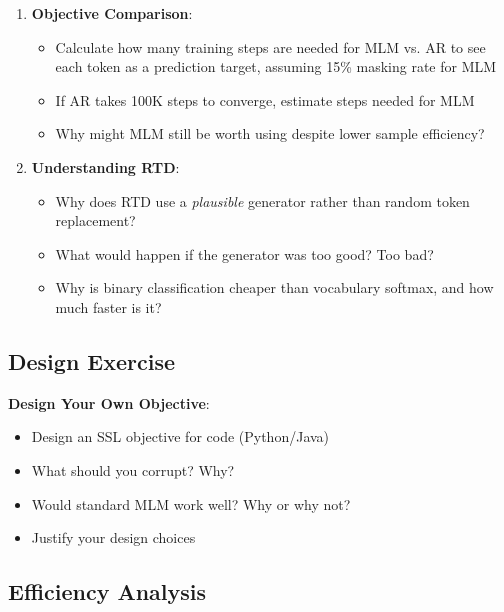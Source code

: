\documentclass{article}
\begin{document}
\begin{enumerate}
\item \textbf{Objective Comparison}:
\begin{itemize}
\item Calculate how many training steps are needed for MLM vs. AR to see each token as a prediction target, assuming 15\% masking rate for MLM
\item If AR takes 100K steps to converge, estimate steps needed for MLM
\item Why might MLM still be worth using despite lower sample efficiency?
\end{itemize}

\item \textbf{Understanding RTD}:
\begin{itemize}
\item Why does RTD use a \textit{plausible} generator rather than random token replacement?
\item What would happen if the generator was too good? Too bad?
\item Why is binary classification cheaper than vocabulary softmax, and how much faster is it?
\end{itemize}
\end{enumerate}

\subsection{Design Exercise}

\textbf{Design Your Own Objective}:
\begin{itemize}
\item Design an SSL objective for code (Python/Java)
\item What should you corrupt? Why?
\item Would standard MLM work well? Why or why not?
\item Justify your design choices
\end{itemize}

\subsection{Efficiency Analysis}
\end{document}
